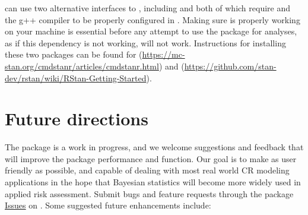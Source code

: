\documentclass[
  shortnames]{jss}
\begin{document}
 can use two alternative interfaces to , including  \citep{rstan2021} and  \citep{cmdstanr2022}
both of which require  and the g++ compiler to be properly configured in .
Making sure  is properly working on your machine is essential before any
attempt to use the  package for analyses, as if this dependency is not
working,  will not work. Instructions for installing these two packages can be found for  (\url{https://mc-stan.org/cmdstanr/articles/cmdstanr.html}) and  (\url{https://github.com/stan-dev/rstan/wiki/RStan-Getting-Started}).

\hypertarget{future-directions}{%
\section{Future directions}\label{future-directions}}

The  package is a work in progress, and we welcome suggestions and feedback that will improve the package performance and function. Our goal is to make  as user friendly as possible, and capable of dealing with most real world CR modeling applications in the hope that Bayesian statistics will become more widely used in applied risk assessment. Submit bugs and feature requests through the package \href{https://github.com/open-AIMS/bayesnec/issues}{Issues} on . Some suggested future enhancements include:
\end{document}
